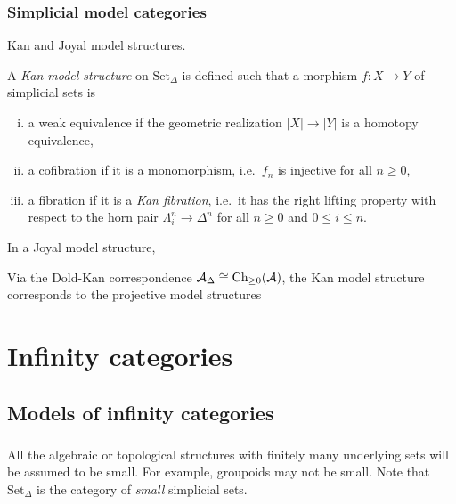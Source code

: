 \documentclass{../../large}
\begin{document}
\section{Simplicial model categories}
\begin{prb}
Kan and Joyal model structures.

A \emph{Kan model structure} on $\mathrm{Set}_\Delta$ is defined such that a morphism $f:X\to Y$ of simplicial sets is
\begin{enumerate}[(i)]
\item a weak equivalence if the geometric realization $|X|\to|Y|$ is a homotopy equivalence,
\item a cofibration if it is a monomorphism, i.e.~$f_n$ is injective for all $n\ge0$,
\item a fibration if it is a \emph{Kan fibration}, i.e.~it has the right lifting property with respect to the horn pair $\Lambda_i^n\to\Delta^n$ for all $n\ge0$ and $0\le i\le n$.
\end{enumerate}


In a Joyal model structure,

Via the Dold-Kan correspondence $\mathcal{A}_\Delta\cong\mathrm{Ch}_{\ge0}(\mathcal{A})$, the Kan model structure corresponds to the projective model structures
\end{prb}


\chapter{}







\part{Infinity categories}
\chapter{Models of infinity categories}
\section{}

All the algebraic or topological structures with finitely many underlying sets will be assumed to be small.
For example, groupoids may not be small.
Note that $\mathrm{Set}_\Delta$ is the category of \emph{small} simplicial sets.
\end{document}
